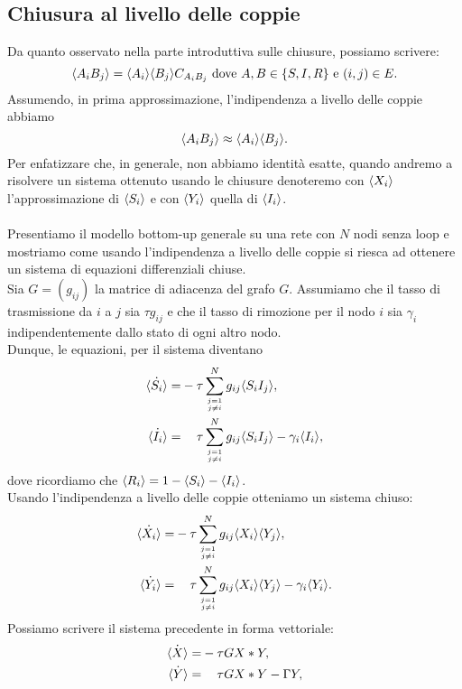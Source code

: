 \subsection{Chiusura al livello delle coppie}
Da quanto osservato nella parte introduttiva sulle chiusure, possiamo scrivere:
$$ \langle  A_i B_j \rangle = \langle  A_i \rangle \langle B_j \rangle C_{A_i B_j} \text{ dove } A,B\in \{S,I,R\} \text{ e } (i,j)\in E.$$ 
Assumendo, in prima approssimazione, l'indipendenza a livello delle coppie abbiamo 
$$ \langle  A_i B_j \rangle \approx \langle A_i \rangle\langle B_j \rangle.$$ 
Per enfatizzare che, in generale, non abbiamo identit\`a esatte, quando andremo a risolvere un sistema ottenuto usando le chiusure denoteremo  con $\langle X_i \rangle$ l'approssimazione di $\langle  S_i \rangle$ e con $\langle  Y_i \rangle$ quella di $\langle  I_i \rangle$.\\ \\
Presentiamo il modello bottom-up generale su una rete con $N$ nodi senza loop e mostriamo come usando l'indipendenza a livello delle coppie si riesca ad ottenere un sistema di equazioni differenziali chiuse.\\
Sia $G=(g_{ij})$ la matrice di adiacenza del grafo $G$. Assumiamo che il tasso di trasmissione da $i$ a $j$ sia $\tau g_{ij}$ e che il tasso di rimozione per il nodo $i$ sia $\gamma_i$ indipendentemente dallo stato di ogni altro nodo.\\
Dunque, le equazioni, per il sistema diventano
\begin{equation}
\begin{aligned}
	 \dot{\angol{ S_i}}=& - \tau\sum_{j=1\atop{j\neq i }}^N g_{ij} \angol{ S_i I_j},\\
	 \dot{\angol{I_i}} =&\spa \tau \sum_{j=1\atop{j\neq i}}^N  g_{ij} \angol{ S_i I_j} -\gamma_i \angol{I_i},
\end{aligned}
\end{equation}
dove ricordiamo che $\langle R_i \rangle=1-\langle S_i \rangle- \langle I_i \rangle$.\\
Usando l'indipendenza a livello delle coppie otteniamo  un sistema chiuso: 
\begin{equation}
\begin{aligned}
	 \dot{\angol{ X_i}} =& -\tau \sum_{j=1\atop{j\neq i }}^N g_{ij}\angol{ X_i} \angol{Y_j},\\
	 \dot{\angol{Y_i}} =&\spa \tau \sum_{j=1\atop{j\neq i}}^N  g_{ij}\angol{ X_i}\angol{Y_j} -\gamma_i \angol{Y_i}.
\end{aligned}
\label{Chiuso_coppie}
\end{equation}
Possiamo scrivere il sistema precedente in forma vettoriale:
\begin{equation}
	\begin{aligned}
	\dot{\angol{X}} = & - \tau G X * Y,\\
	\dot{\angol{Y}}=& \spa \tau G X * Y - \Gamma Y,	
	\end{aligned}
\end{equation}

